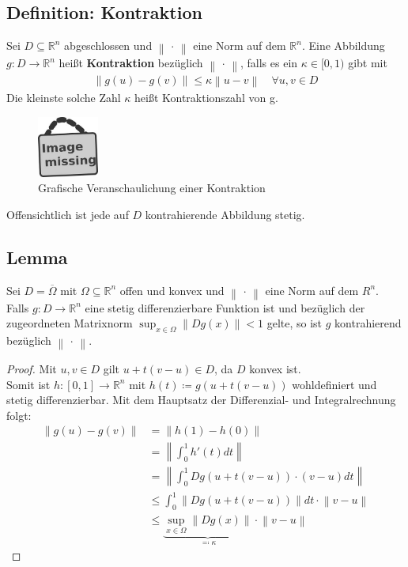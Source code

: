 \documentclass[ngerman,fontsize=11pt, paper=a4, parskip=half, titlepage=true, toc=bib]{scrbook}
\newcommand{\R}{\mathds{R}}
\newcommand{\nn}[1]{\left\| #1 \right\|}
\newcommand{\imagemissing}[1]{
	\begin{figure}
		\centering
		\includegraphics[width=2cm]{images/image_missing.jpg}
		\caption{#1}
	\end{figure}
}
\begin{document}
	\subsection{Definition: Kontraktion} 
	Sei $D\subseteq  \R^n $ abgeschlossen und $\nn{\,\cdot\,}$ eine Norm auf dem $\R^n$.
	Eine Abbildung $g:D\rightarrow \R^n $ heißt \textbf{Kontraktion} bezüglich  $\nn{\,\cdot\,}$,
	falls es ein $\kappa \in [0,1)$ gibt mit
	\begin{gather*}
		\nn{g(u)-g(v)} \leq \kappa \nn{u-v} \quad \forall u,v\in D
	\end{gather*}
	Die kleinste solche Zahl $\kappa$ heißt Kontraktionszahl von g.
	
	\imagemissing{Grafische Veranschaulichung einer Kontraktion}
	
	Offensichtlich ist jede auf $D$ kontrahierende Abbildung stetig.
	
	\subsection{Lemma} \label{5.2.3}
	Sei $D=\overline{\Omega} $ mit $\Omega \subseteq \R^n$ offen und konvex
	und $\nn{\,\cdot\,}$ eine Norm auf dem $R^n$.\\
	Falls $g:D\longrightarrow \R^n$ eine stetig differenzierbare Funktion ist und
	bezüglich der zugeordneten Matrixnorm $\sup_{x\in \Omega}\nn{Dg(x)}<1$ gelte,
	so ist $g$ kontrahierend bezüglich  $\nn{\,\cdot\,}$.
	
	\begin{proof}
		Mit $u,v \in D$ gilt $u+t(v-u)\in D$, da $D$ konvex ist. \\
		Somit ist $h:[0,1]\rightarrow \R^n $ mit $h(t) \coloneqq g(u+t(v-u))$ wohldefiniert
		und stetig differenzierbar. Mit dem Hauptsatz der Differenzial- und Integralrechnung
		folgt:
		\begin{align}\nonumber
			\nn{g(u)-g(v)} & = \nn{h(1)-h(0)}  \\ \nonumber
										& = \nn{\int_{0}^{1} h'(t) dt} \\ \nonumber
										& = \nn{\int_{0}^{1} Dg(u+t(v-u))\cdot (v-u)dt} \\ \nonumber
										& \leq \int_{0}^{1} \nn{Dg(u+t(v-u))}dt \cdot \nn{v-u} \\
										& \leq \underbrace{\sup_{x\in\Omega}\nn{Dg(x)}}_{\eqqcolon \kappa} 
										    \cdot \nn{v-u}
										    \label{V.2.4}
		\end{align}
	\end{proof}
	
\end{document}
